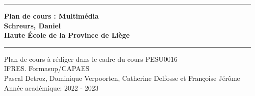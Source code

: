 \newcommand{\JMUTitle}[9]{
    \thispagestyle{empty}
    \vspace*{\stretch{1}}
    {\parindent0cm
        \rule{\linewidth}{.7ex}}
    \begin{flushright}
        \vspace*{\stretch{1}}
        \bfseries\Huge
        #1\\
        \vspace*{\stretch{1}}
        \bfseries\large
        #4\\
        \vspace*{\stretch{1}}
        \bfseries\large
        #9
    \end{flushright}
    \rule{\linewidth}{.7ex}

    \vspace*{\stretch{1}}
    \begin{center}
        \vspace*{\stretch{1}}
        \Large #3 \\

        \vspace*{\stretch{2}}
        \large IFRES. Formasup/CAPAES\\
        \vspace*{\stretch{1}}
        \large   #8 \\[1mm]
        \large Année académique: #5 - #6
    \end{center}
}
\JMUTitle
{Plan de cours : Multimédia}                                %
{Kurztitel der Arbeit}                            %
{Plan de cours à rédiger dans le cadre du cours PESU0016}       %
{Schreurs, Daniel }                              %
{2022}                                      %
{2023}                                      %
{Bachelor/Master Wirtschaftsinformatik}           %
{Pascal Detroz, Dominique Verpoorten, Catherine Delfosse et Françoise Jérôme}                       %
{Haute École de la Province de Liège}                                        %
\clearpage